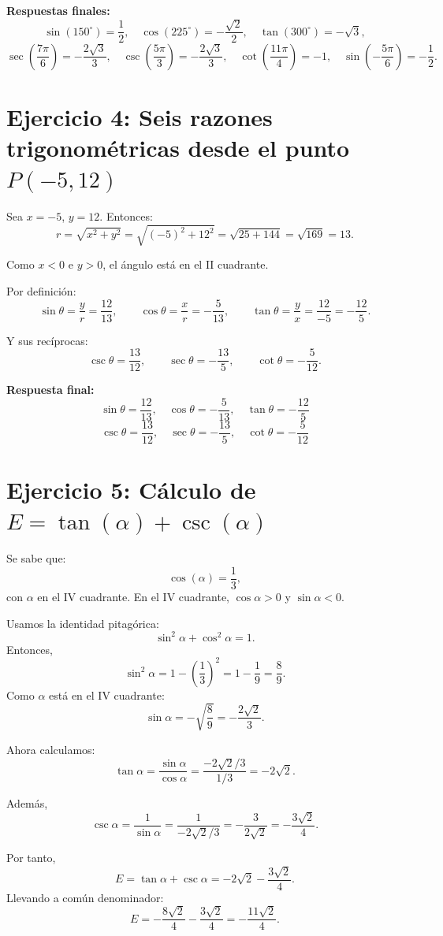 \documentclass[12pt]{article}
\begin{document}
	\textbf{Respuestas finales:}
	\[
	\sin(150^\circ)=\frac12,
	\quad
	\cos(225^\circ)=-\frac{\sqrt2}{2},
	\quad
	\tan(300^\circ)=-\sqrt3,
	\]
	\[
	\sec\left(\frac{7\pi}{6}\right)=-\frac{2\sqrt3}{3},
	\quad
	\csc\left(\frac{5\pi}{3}\right)=-\frac{2\sqrt3}{3},
	\quad
	\cot\left(\frac{11\pi}{4}\right)=-1,
	\quad
	\sin\left(-\frac{5\pi}{6}\right)=-\frac12.
	\]
	
	\section*{Ejercicio 4: Seis razones trigonométricas desde el punto \(P(-5,12)\)}
	Sea \(x=-5\), \(y=12\). Entonces:
	\[
	r=\sqrt{x^2+y^2}=\sqrt{(-5)^2+12^2}=\sqrt{25+144}=\sqrt{169}=13.
	\]
	
	Como \(x<0\) e \(y>0\), el ángulo está en el II cuadrante.
	
	Por definición:
	\[
	\sin\theta=\frac{y}{r}=\frac{12}{13},
	\qquad
	\cos\theta=\frac{x}{r}=-\frac{5}{13},
	\qquad
	\tan\theta=\frac{y}{x}=\frac{12}{-5}=-\frac{12}{5}.
	\]
	
	Y sus recíprocas:
	\[
	\csc\theta=\frac{13}{12},
	\qquad
	\sec\theta=-\frac{13}{5},
	\qquad
	\cot\theta=-\frac{5}{12}.
	\]
	
	\textbf{Respuesta final:}
	\[
	\boxed{\sin\theta=\frac{12}{13},\quad \cos\theta=-\frac{5}{13},\quad \tan\theta=-\frac{12}{5}}
	\]
	\[
	\boxed{\csc\theta=\frac{13}{12},\quad \sec\theta=-\frac{13}{5},\quad \cot\theta=-\frac{5}{12}}
	\]
	
	\section*{Ejercicio 5: Cálculo de \(E=\tan(\alpha)+\csc(\alpha)\)}
	Se sabe que:
	\[
	\cos(\alpha)=\frac13,
	\]
	con \(\alpha\) en el IV cuadrante. En el IV cuadrante, \(\cos\alpha>0\) y \(\sin\alpha<0\).
	
	Usamos la identidad pitagórica:
	\[
	\sin^2\alpha+\cos^2\alpha=1.
	\]
	Entonces,
	\[
	\sin^2\alpha=1-\left(\frac13\right)^2=1-\frac19=\frac89.
	\]
	Como \(\alpha\) está en el IV cuadrante:
	\[
	\sin\alpha=-\sqrt{\frac89}=-\frac{2\sqrt2}{3}.
	\]
	
	Ahora calculamos:
	\[
	\tan\alpha=\frac{\sin\alpha}{\cos\alpha}=\frac{-2\sqrt2/3}{1/3}=-2\sqrt2.
	\]
	
	Además,
	\[
	\csc\alpha=\frac{1}{\sin\alpha}=\frac{1}{-2\sqrt2/3}=-\frac{3}{2\sqrt2}=-\frac{3\sqrt2}{4}.
	\]
	
	Por tanto,
	\[
	E=\tan\alpha+\csc\alpha=-2\sqrt2-\frac{3\sqrt2}{4}.
	\]
	Llevando a común denominador:
	\[
	E=-\frac{8\sqrt2}{4}-\frac{3\sqrt2}{4}=-\frac{11\sqrt2}{4}.
	\]
	
\end{document}
